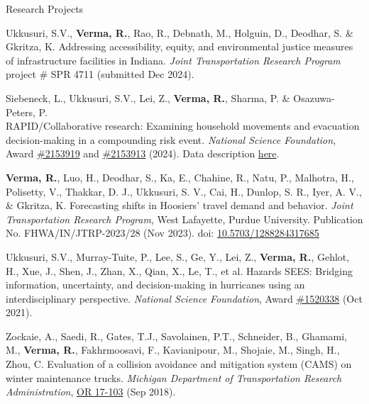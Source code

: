 \documentclass{CV} %
\begin{document}
\begin{rSection}{Research Projects}
    \begin{etaremune}
        \item Ukkusuri, S.V., \textbf{Verma, R.}, Rao, R., Debnath, M., Holguin, D., Deodhar, S. \& Gkritza, K. Addressing accessibility, equity, and environmental justice measures of infrastructure facilities in Indiana. \textit{Joint Transportation Research Program} project \# SPR 4711 (submitted Dec 2024).
        
        \item Siebeneck, L., Ukkusuri, S.V., Lei, Z., \textbf{Verma, R.}, Sharma, P. \& Osazuwa-Peters, P. \\
        RAPID/Collaborative research: Examining household movements and evacuation decision-making in a compounding risk event. \textit{National Science Foundation}, Award \href{https://www.nsf.gov/awardsearch/showAward?AWD_ID=2153919}{\#2153919} and \href{https://www.nsf.gov/awardsearch/showAward?AWD_ID=2153913&HistoricalAwards=false}{\#2153913} (2024). Data description \href{https://digital.library.unt.edu/ark:/67531/metadc1872507/}{here}.

        \item \textbf{Verma, R.}, Luo, H., Deodhar, S., Ka, E., Chahine, R., Natu, P., Malhotra, H., Polisetty, V., Thakkar, D. J., Ukkusuri, S. V., Cai, H., Dunlop, S. R., Iyer, A. V., \& Gkritza, K. Forecasting shifts in Hoosiers' travel demand and behavior. \textit{Joint Transportation Research Program}, West Lafayette, Purdue University. Publication No. FHWA/IN/JTRP-2023/28 (Nov 2023). doi: \href{https://doi.org/10.5703/1288284317685}{10.5703/1288284317685}

        \item Ukkusuri, S.V., Murray-Tuite, P., Lee, S., Ge, Y., Lei, Z., \textbf{Verma, R.}, Gehlot, H., Xue, J., Shen, J., Zhan, X., Qian, X., Le, T., et al. Hazards SEES: Bridging information, uncertainty, and decision-making in hurricanes using an interdisciplinary perspective. \textit{National Science Foundation}, Award \href{https://www.nsf.gov/awardsearch/showAward?AWD_ID=1520338}{\#1520338} (Oct 2021).
        
        \item Zockaie, A., Saedi, R., Gates, T.J., Savolainen, P.T., Schneider, B., Ghamami, M., \textbf{Verma, R.}, Fakhrmoosavi, F., Kavianipour, M., Shojaie, M., Singh, H., Zhou, C. Evaluation of a collision avoidance and mitigation system (CAMS) on winter maintenance trucks. \textit{Michigan Department of Transportation Research Administration}, \href{https://rosap.ntl.bts.gov/view/dot/42752}{OR 17-103} (Sep 2018).
    \end{etaremune}

\end{rSection}
\end{document}
